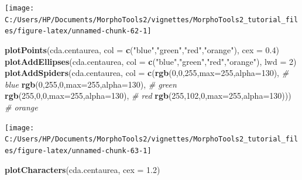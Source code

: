 \documentclass[
]{article}
\newenvironment{Shaded}{\begin{snugshade}}{\end{snugshade}}
\newcommand{\CommentTok}[1]{\textcolor[rgb]{0.56,0.35,0.01}{\textit{#1}}}
\newcommand{\DataTypeTok}[1]{\textcolor[rgb]{0.13,0.29,0.53}{#1}}
\newcommand{\DecValTok}[1]{\textcolor[rgb]{0.00,0.00,0.81}{#1}}
\newcommand{\FloatTok}[1]{\textcolor[rgb]{0.00,0.00,0.81}{#1}}
\newcommand{\KeywordTok}[1]{\textcolor[rgb]{0.13,0.29,0.53}{\textbf{#1}}}
\newcommand{\NormalTok}[1]{#1}
\newcommand{\StringTok}[1]{\textcolor[rgb]{0.31,0.60,0.02}{#1}}
\begin{document}
\begin{center}\texttt{[image: C:/Users/HP/Documents/MorphoTools2/vignettes/MorphoTools2\_tutorial\_files/figure-latex/unnamed-chunk-62-1]} \end{center}

\begin{Shaded}
\begin{Highlighting}[]
\KeywordTok{plotPoints}\NormalTok{(cda.centaurea, }\DataTypeTok{col =} \KeywordTok{c}\NormalTok{(}\StringTok{"blue"}\NormalTok{,}\StringTok{"green"}\NormalTok{,}\StringTok{"red"}\NormalTok{,}\StringTok{"orange"}\NormalTok{), }\DataTypeTok{cex =} \FloatTok{0.4}\NormalTok{)}
\KeywordTok{plotAddEllipses}\NormalTok{(cda.centaurea, }\DataTypeTok{col =} \KeywordTok{c}\NormalTok{(}\StringTok{"blue"}\NormalTok{,}\StringTok{"green"}\NormalTok{,}\StringTok{"red"}\NormalTok{,}\StringTok{"orange"}\NormalTok{), }\DataTypeTok{lwd =} \DecValTok{2}\NormalTok{)}
\KeywordTok{plotAddSpiders}\NormalTok{(cda.centaurea, }\DataTypeTok{col =} \KeywordTok{c}\NormalTok{(}\KeywordTok{rgb}\NormalTok{(}\DecValTok{0}\NormalTok{,}\DecValTok{0}\NormalTok{,}\DecValTok{255}\NormalTok{,}\DataTypeTok{max=}\DecValTok{255}\NormalTok{,}\DataTypeTok{alpha=}\DecValTok{130}\NormalTok{), }\CommentTok{# blue}
                                      \KeywordTok{rgb}\NormalTok{(}\DecValTok{0}\NormalTok{,}\DecValTok{255}\NormalTok{,}\DecValTok{0}\NormalTok{,}\DataTypeTok{max=}\DecValTok{255}\NormalTok{,}\DataTypeTok{alpha=}\DecValTok{130}\NormalTok{), }\CommentTok{# green}
                                      \KeywordTok{rgb}\NormalTok{(}\DecValTok{255}\NormalTok{,}\DecValTok{0}\NormalTok{,}\DecValTok{0}\NormalTok{,}\DataTypeTok{max=}\DecValTok{255}\NormalTok{,}\DataTypeTok{alpha=}\DecValTok{130}\NormalTok{), }\CommentTok{# red}
                                      \KeywordTok{rgb}\NormalTok{(}\DecValTok{255}\NormalTok{,}\DecValTok{102}\NormalTok{,}\DecValTok{0}\NormalTok{,}\DataTypeTok{max=}\DecValTok{255}\NormalTok{,}\DataTypeTok{alpha=}\DecValTok{130}\NormalTok{))) }\CommentTok{# orange}
\end{Highlighting}
\end{Shaded}

\begin{center}\texttt{[image: C:/Users/HP/Documents/MorphoTools2/vignettes/MorphoTools2\_tutorial\_files/figure-latex/unnamed-chunk-63-1]} \end{center}

\begin{Shaded}
\begin{Highlighting}[]
\KeywordTok{plotCharacters}\NormalTok{(cda.centaurea, }\DataTypeTok{cex =} \FloatTok{1.2}\NormalTok{)}
\end{Highlighting}
\end{Shaded}
\end{document}
